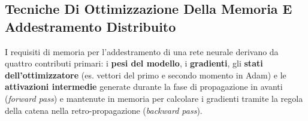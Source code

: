 \documentclass[11pt, a4paper]{article}
\begin{document}

\subsection{Tecniche Di Ottimizzazione Della Memoria E Addestramento Distribuito}

I requisiti di memoria per l'addestramento di una rete neurale derivano da quattro contributi primari: i \textbf{pesi del modello}, i \textbf{gradienti}, gli \textbf{stati dell'ottimizzatore} (es. vettori del primo e secondo momento in Adam) e le \textbf{attivazioni intermedie} generate durante la fase di propagazione in avanti (\emph{forward pass}) e mantenute in memoria per calcolare i gradienti tramite la regola della catena nella retro-propagazione (\emph{backward pass}).
\end{document}
